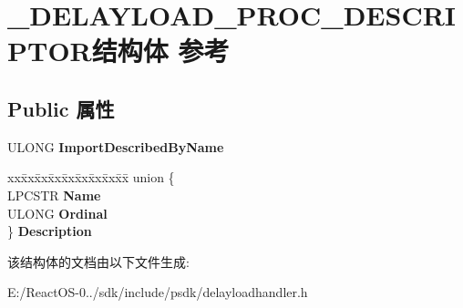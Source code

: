 \hypertarget{struct___d_e_l_a_y_l_o_a_d___p_r_o_c___d_e_s_c_r_i_p_t_o_r}{}\section{\+\_\+\+D\+E\+L\+A\+Y\+L\+O\+A\+D\+\_\+\+P\+R\+O\+C\+\_\+\+D\+E\+S\+C\+R\+I\+P\+T\+O\+R结构体 参考}
\label{struct___d_e_l_a_y_l_o_a_d___p_r_o_c___d_e_s_c_r_i_p_t_o_r}
\subsection*{Public 属性}
\begin{DoxyCompactItemize}
\item 
\mbox{\label{struct___d_e_l_a_y_l_o_a_d___p_r_o_c___d_e_s_c_r_i_p_t_o_r_a426c4c967271a86c85d8749ccadc1e22}} 
U\+L\+O\+NG {\bfseries Import\+Described\+By\+Name}
\item 
\mbox{\label{struct___d_e_l_a_y_l_o_a_d___p_r_o_c___d_e_s_c_r_i_p_t_o_r_a81fdbb24c63a63f640932b1ad5f020ba}} 
\begin{tabbing}
xx\=xx\=xx\=xx\=xx\=xx\=xx\=xx\=xx\=\kill
union \{\\
\>LPCSTR {\bfseries Name}\\
\>ULONG {\bfseries Ordinal}\\
\} {\bfseries Description}\\

\end{tabbing}\end{DoxyCompactItemize}


该结构体的文档由以下文件生成\+:\begin{DoxyCompactItemize}
\item 
E\+:/\+React\+O\+S-\/0../sdk/include/psdk/delayloadhandler.\+h\end{DoxyCompactItemize}
